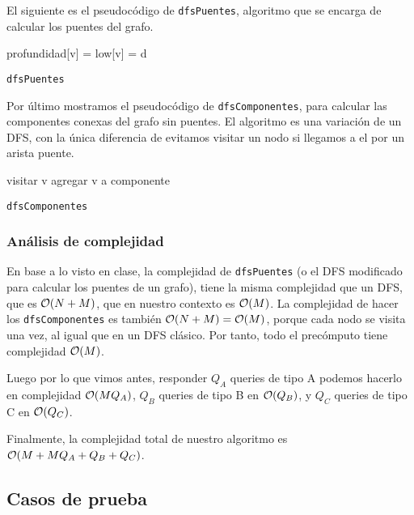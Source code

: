 El siguiente es el pseudocódigo de \texttt{dfsPuentes}, algoritmo que se encarga de calcular 
los puentes del grafo. 

\begin{algorithm}[H]
profundidad[v] = low[v] = d\;
\caption{\texttt{dfsPuentes}}
\end{algorithm}

Por último mostramos el pseudocódigo de \texttt{dfsComponentes}, para calcular 
las componentes conexas del grafo sin puentes. El algoritmo es una variación 
de un DFS, con la única diferencia de evitamos visitar un nodo si llegamos a el 
por un arista puente. 

\begin{algorithm}[H]
visitar v\;
agregar v a componente\;
\caption{\texttt{dfsComponentes}}
\end{algorithm}

\subsubsection*{Análisis de complejidad}

En base a lo visto en clase, la complejidad de \texttt{dfsPuentes} 
(o el DFS modificado para calcular los puentes de un grafo), tiene 
la misma complejidad que un DFS, que es $\mathcal{O}(N + M)$, que en nuestro contexto 
es $\mathcal{O}(M)$. La complejidad de hacer los \texttt{dfsComponentes} es también $\mathcal{O}(N + M) = \mathcal{O}(M)$, 
porque cada nodo se visita una vez, al igual que en un DFS clásico. Por tanto, 
todo el precómputo tiene complejidad $\mathcal{O}(M)$. 

Luego por lo que vimos antes, responder $Q_A$ queries de tipo A podemos 
hacerlo en complejidad $\mathcal{O}(MQ_A)$, $Q_B$ queries de tipo B en $\mathcal{O}(Q_B)$, y $Q_C$ 
queries de tipo C en $\mathcal{O}(Q_C)$. 

Finalmente, la complejidad total de nuestro algoritmo 
es $\mathcal{O}(M + MQ_A + Q_B + Q_C)$. 

\subsection{Casos de prueba}

